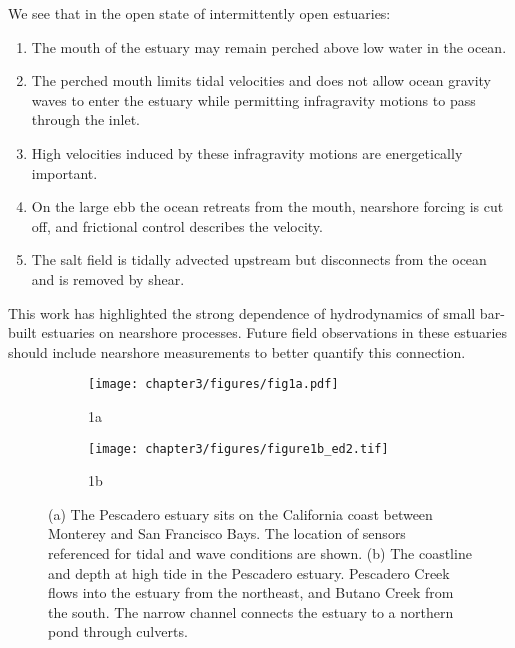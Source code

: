 We see that in the open state of intermittently open estuaries:
\begin{enumerate}
\item The mouth of the estuary may remain perched above low water in the
ocean.
\item The perched mouth limits tidal velocities and does not allow ocean
gravity waves to enter the estuary while permitting infragravity motions
to pass through the inlet.
\item High velocities induced by these infragravity motions are energetically
important.
\item On the large ebb the ocean retreats from the mouth, nearshore forcing
is cut off, and frictional control describes the velocity.
\item The salt field is tidally advected upstream but disconnects from the
ocean and is removed by shear.
\end{enumerate}
This work has highlighted the strong dependence of hydrodynamics of
small bar-built estuaries on nearshore processes. Future field observations
in these estuaries should include nearshore measurements to better
quantify this connection. 








\begin{figure}[t]
\begin{subfigure}{.5\textwith}
	\centering
	\texttt{[image: chapter3/figures/fig1a.pdf]}
	\caption{1a}
	\label{fig:sfig1a_coastline}
\end{subfigure}
\begin{subfigure}{.5\textwith}
	\centering
	\texttt{[image: chapter3/figures/figure1b\_ed2.tif]}
	\caption{1b}
	\label{fig:sfig1b_pdomap}
\end{subfigure}
\caption{(a) The Pescadero estuary sits on the California coast between Monterey
and San Francisco Bays. The location of sensors referenced for tidal
and wave conditions are shown. (b) The coastline and depth at high
tide in the Pescadero estuary. Pescadero Creek flows into the estuary
from the northeast, and Butano Creek from the south. The narrow channel
connects the estuary to a northern pond through culverts.}
\label{f1_maps}
\end{figure}


